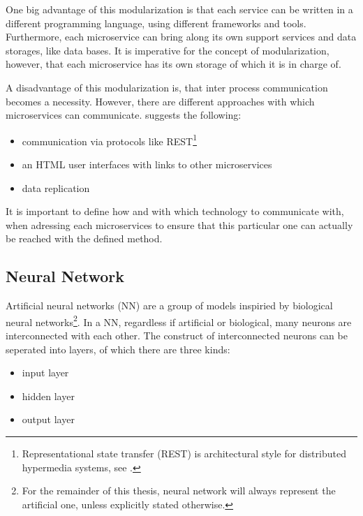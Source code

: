 One big advantage of this modularization is that each service can be written in a different programming language, using different frameworks and tools. Furthermore, each microservice can bring along its own support services and data storages, like data bases. It is imperative for the concept of modularization, however, that each microservice has its own storage of which it is in charge of.

A disadvantage of this modularization is, that inter process communication becomes a necessity. However, there are different approaches with which microservices can communicate. \cite{Wolff16} suggests the following:

\begin{itemize}
	\item communication via protocols like REST\footnote{Representational state transfer (REST) is architectural style for distributed hypermedia systems, see \cite{Fielding00}.}
	\item an HTML user interfaces with links to other microservices
	\item data replication
\end{itemize}

It is important to define how and with which technology to communicate with, when adressing each microservices to ensure that this particular one can actually be reached with the defined method.


\subsection{Neural Network}

Artificial neural networks (NN) are a group of models inspiried by biological neural networks\footnote{For the remainder of this thesis, neural network will always represent the artificial one, unless explicitly stated otherwise.}. In a NN, regardless if artificial or biological, many neurons are interconnected with each other. The construct of interconnected neurons can be seperated into layers, of which there are three kinds:

\begin{itemize}
	\item input layer
	\item hidden layer
	\item output layer
\end{itemize}

